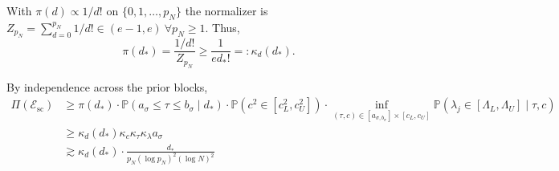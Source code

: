 \documentclass[11pt]{article}
\theoremstyle{plain}
\theoremstyle{definition}
\theoremstyle{plain}
\begin{document}
With $\pi(d) \propto 1/d!$ on $\{0,1,\dots,p_N\}$ the normalizer is $Z_{p_N} = \sum_{d=0}^{p_N} 1/d! \in (e-1,e) \ \forall p_N \ge 1.$ Thus, 
\[
\pi(d_{*}) = \frac{1/d!}{Z_{p_N}} \ge \frac{1}{e d_{*} !} =: \kappa_{d} (d_{*}).
\]

By independence across the prior blocks, 
\begin{equation}\label{eq:RHS-Esc-mass-fixed}
    \begin{split}
    \Pi(\mathcal{E}_{\textrm{sc}}) & \ge \pi(d_{*}) \cdot \mathbb{P}(a_{\sigma} \le \tau \le b_{\sigma} \mid d_{*}) \cdot \mathbb{P}(c^2 \in [c_L ^2, c_U ^2]) \cdot \inf_{(\tau,c) \in [a_{\sigma,b_{\sigma}}] \times [c_L,c_U]} \mathbb{P}(\lambda_j \in [\Lambda_L,\Lambda_{U}] \mid \tau,c) \\
     & \ge \kappa_d (d_{*}) \kappa_c \kappa_{\tau} \kappa_{\lambda} a_{\sigma} \\
     & \gtrsim \kappa_{d}(d_{*}) \cdot \frac{d_{*}}{p_N(\log p_N)^2 (\log N)^2} 
    \end{split}
\end{equation}
\end{document}

